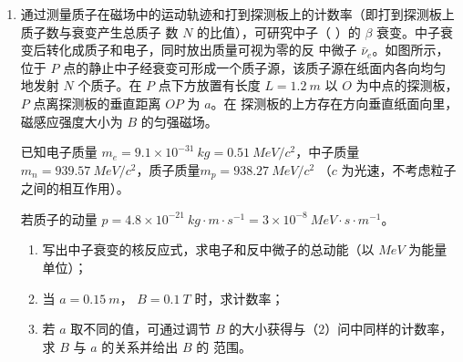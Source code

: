 \begin{enumerate}
\newpage

\item 
通过测量质子在磁场中的运动轨迹和打到探测板上的计数率（即打到探测板上质子数与衰变产生总质子
数 $ N $ 的比值），可研究中子（  ）的 $ \beta $ 衰变。中子衰变后转化成质子和电子，同时放出质量可视为零的反
中微子 $ \bar{\nu}_{e} $。如图所示，位于 $ P $ 点的静止中子经衰变可形成一个质子源，该质子源在纸面内各向均匀地发射
$ N $ 个质子。在 $ P $ 点下方放置有长度 $ L=1.2 \ m $ 以 $ O $ 为中点的探测板，$ P $ 点离探测板的垂直距离 $ OP $ 为 $ a $。在
探测板的上方存在方向垂直纸面向里，磁感应强度大小为 $ B $ 的匀强磁场。

已知电子质量 $ m_e=9.1 \times10^{-31} \ kg=0.51 \ MeV/c^{2} $，中子质量 $ m_n=939.57 \ MeV/c^{2} $，质子质量$ m_p=938.27 \ MeV/c^{2} $ （$ c $ 为光速，不考虑粒子之间的相互作用）。

若质子的动量 $ p=4.8\times10^{-21} \ kg \cdot m \cdot s^{-1}=3 \times 10^{-8} \ MeV \cdot s \cdot m^{-1} $。
\begin{enumerate}
\item
写出中子衰变的核反应式，求电子和反中微子的总动能（以 $ MeV $ 为能量单位）；
\item 
当 $ a=0.15 \ m $， $ B=0.1 \ T $ 时，求计数率；
\item 
若 $ a $ 取不同的值，可通过调节 $ B $ 的大小获得与（$ 2 $）问中同样的计数率，求 $ B $ 与 $ a $ 的关系并给出 $ B $ 的
范围。


\end{enumerate}
\begin{figure}[h!]
\flushright

\end{figure}





\end{enumerate}

